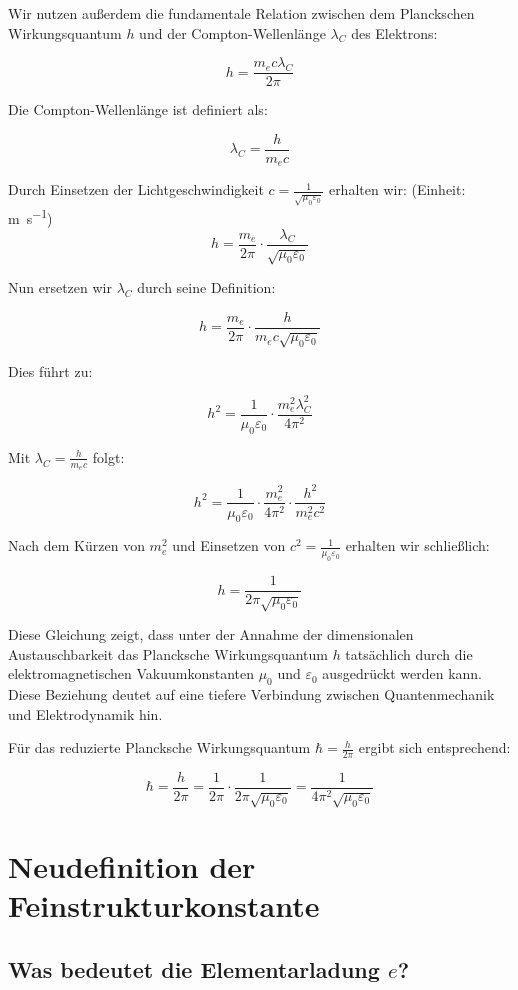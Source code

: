 \documentclass{article}
\begin{document}
	Wir nutzen außerdem die fundamentale Relation zwischen dem Planckschen Wirkungsquantum $h$ und der Compton-Wellenlänge $\lambda_C$ des Elektrons:
	
	$$h = \frac{m_e c \lambda_C}{2\pi}$$
	
	Die Compton-Wellenlänge ist definiert als:
	
	$$\lambda_C = \frac{h}{m_e c}$$
	
	Durch Einsetzen der Lichtgeschwindigkeit $c = \frac{1}{\sqrt{\mu_0\varepsilon_0}}$ erhalten wir:
 (Einheit: \si{\meter\per\second})	
	$$h = \frac{m_e}{2\pi} \cdot \frac{\lambda_C}{\sqrt{\mu_0\varepsilon_0}}$$
	
	Nun ersetzen wir $\lambda_C$ durch seine Definition:
	
	$$h = \frac{m_e}{2\pi} \cdot \frac{h}{m_e c \sqrt{\mu_0\varepsilon_0}}$$
	
	Dies führt zu:
	
	$$h^2 = \frac{1}{\mu_0\varepsilon_0} \cdot \frac{m_e^2 \lambda_C^2}{4\pi^2}$$
	
	Mit $\lambda_C = \frac{h}{m_e c}$ folgt:
	
	$$h^2 = \frac{1}{\mu_0\varepsilon_0} \cdot \frac{m_e^2}{4\pi^2} \cdot \frac{h^2}{m_e^2c^2}$$
	
	Nach dem Kürzen von $m_e^2$ und Einsetzen von $c^2 = \frac{1}{\mu_0\varepsilon_0}$ erhalten wir schließlich:
	
	$$h = \frac{1}{2\pi\sqrt{\mu_0\varepsilon_0}}$$
	
	Diese Gleichung zeigt, dass unter der Annahme der dimensionalen Austauschbarkeit das Plancksche Wirkungsquantum $h$ tatsächlich durch die elektromagnetischen Vakuumkonstanten $\mu_0$ und $\varepsilon_0$ ausgedrückt werden kann. Diese Beziehung deutet auf eine tiefere Verbindung zwischen Quantenmechanik und Elektrodynamik hin.
	
	Für das reduzierte Plancksche Wirkungsquantum $\hbar = \frac{h}{2\pi}$ ergibt sich entsprechend:
	
	$$\hbar = \frac{h}{2\pi} = \frac{1}{2\pi} \cdot \frac{1}{2\pi\sqrt{\mu_0\varepsilon_0}} = \frac{1}{4\pi^2\sqrt{\mu_0\varepsilon_0}}$$
	
	\section{Neudefinition der Feinstrukturkonstante}
	
	\subsection{ Was bedeutet die Elementarladung $e$?}
	
\end{document}
